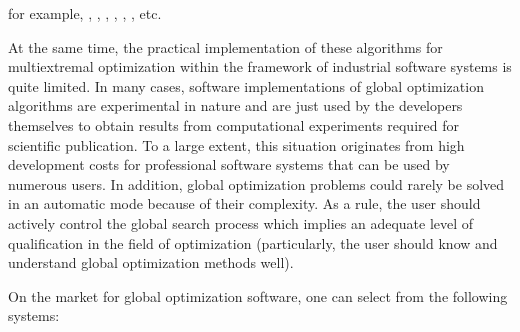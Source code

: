 \documentclass{gOMS2e}
\theoremstyle{plain}%
\theoremstyle{definition}
\theoremstyle{remark}
\begin{document}
for example, \cite{floudasPardalosGOState}, \cite{pinterGO}, \cite{luqueAlbaGA},
\cite{fasanoPinter2013}, \cite{locatelliSchoenGO}, \cite{pardalosZhigljavskyZilinskas2016}, etc.
\par
At the same time, the practical implementation of these algorithms for multiextremal
optimization within the framework of industrial software systems is quite limited.
In many cases, software implementations of global optimization algorithms are experimental in
nature and are just used by the developers themselves to obtain results from computational
experiments required for scientific publication. To a large extent, this situation
originates from high development costs for professional software systems that can be
used by numerous users. In addition, global optimization problems could rarely be
solved in an automatic mode because of their complexity. As a rule, the user should
actively control the global search process which implies an adequate level of
qualification in the field of optimization (particularly, the user should know and
understand global optimization methods well).
\par
On the market for global optimization software, one can select from the following systems:
\end{document}

